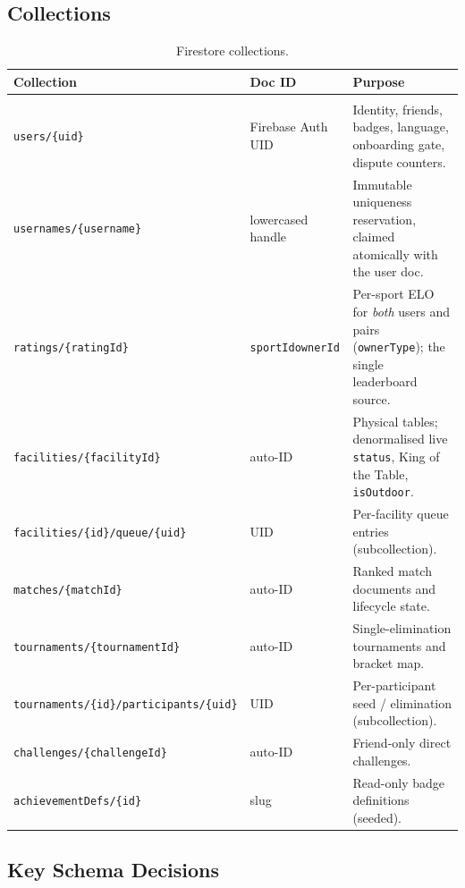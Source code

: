 \documentclass{configurations/polimi3i_thesis}
\renewcommand{\_}{\textunderscore\allowbreak}
\begin{document}
\subsection{Collections}

\begin{table}[H]
    \centering
    \small
    \begin{tabularx}{\textwidth}{l l X}
        \textbf{Collection} & \textbf{Doc ID} & \textbf{Purpose} \\\hline\\[-9px]
        \texttt{users/\{uid\}} & Firebase Auth UID & Identity, friends, badges, language, onboarding gate, dispute counters. \\[3px]
        \texttt{usernames/\{username\}} & lowercased handle & Immutable uniqueness reservation, claimed atomically with the user doc. \\[3px]
        \texttt{ratings/\{ratingId\}} & \texttt{sportId\_ownerId} & Per-sport ELO for \emph{both} users and pairs (\texttt{ownerType}); the single leaderboard source. \\[3px]
        \texttt{facilities/\{facilityId\}} & auto-ID & Physical tables; denormalised live \texttt{status}, King of the Table, \texttt{isOutdoor}. \\[3px]
        \texttt{facilities/\{id\}/queue/\{uid\}} & UID & Per-facility queue entries (subcollection). \\[3px]
        \texttt{matches/\{matchId\}} & auto-ID & Ranked match documents and lifecycle state. \\[3px]
        \texttt{tournaments/\{tournamentId\}} & auto-ID & Single-elimination tournaments and bracket map. \\[3px]
        \texttt{tournaments/\{id\}/participants/\{uid\}} & UID & Per-participant seed / elimination (subcollection). \\[3px]
        \texttt{challenges/\{challengeId\}} & auto-ID & Friend-only direct challenges. \\[3px]
        \texttt{achievementDefs/\{id\}} & slug & Read-only badge definitions (seeded). \\[3px]
    \end{tabularx}
    \caption{Firestore collections.}
    \label{tab:collections}
\end{table}

\subsection{Key Schema Decisions}
\end{document}
